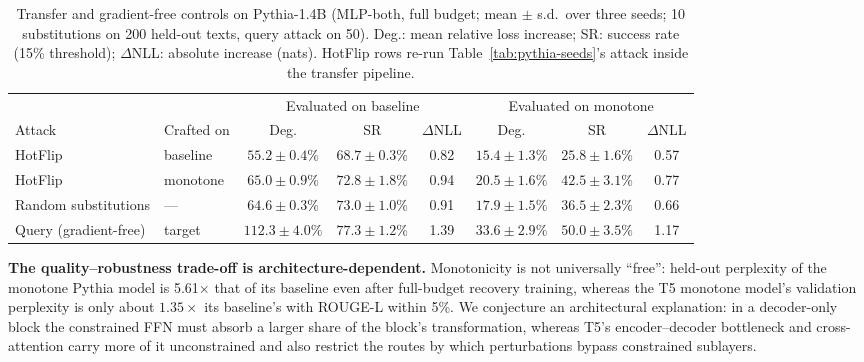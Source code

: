 \documentclass{article}
\theoremstyle{plain}
\theoremstyle{definition}
\theoremstyle{remark}
\theoremstyle{plain}
\begin{document}
\begin{table}[t]
\caption{Transfer and gradient-free controls on Pythia-1.4B (MLP-both, full budget; mean $\pm$ s.d.\ over three seeds; 10 substitutions on 200 held-out texts, query attack on 50). Deg.: mean relative loss increase; SR: success rate (15\% threshold); $\Delta$NLL: absolute increase (nats). HotFlip rows re-run Table~\ref{tab:pythia-seeds}'s attack inside the transfer pipeline.}
\label{tab:pythia-controls}
\centering
\footnotesize
\setlength{\tabcolsep}{2pt}
\begin{tabular}{llcccccc}
\toprule
 & & \multicolumn{3}{c}{Evaluated on baseline} & \multicolumn{3}{c}{Evaluated on monotone} \\
\cmidrule(lr){3-5}\cmidrule(lr){6-8}
Attack & Crafted on & Deg. & SR & $\Delta$NLL & Deg. & SR & $\Delta$NLL \\
\midrule
HotFlip & baseline & $55.2 \pm 0.4\%$ & $68.7 \pm 0.3\%$ & 0.82 & $15.4 \pm 1.3\%$ & $25.8 \pm 1.6\%$ & 0.57 \\
HotFlip & monotone & $65.0 \pm 0.9\%$ & $72.8 \pm 1.8\%$ & 0.94 & $20.5 \pm 1.6\%$ & $42.5 \pm 3.1\%$ & 0.77 \\
Random substitutions & --- & $64.6 \pm 0.3\%$ & $73.0 \pm 1.0\%$ & 0.91 & $17.9 \pm 1.5\%$ & $36.5 \pm 2.3\%$ & 0.66 \\
Query (gradient-free) & target & $112.3 \pm 4.0\%$ & $77.3 \pm 1.2\%$ & 1.39 & $33.6 \pm 2.9\%$ & $50.0 \pm 3.5\%$ & 1.17 \\
\bottomrule
\end{tabular}
\end{table}

\textbf{The quality--robustness trade-off is architecture-dependent.}
Monotonicity is not universally ``free'': held-out perplexity of the monotone Pythia model is 5.61$\times$ that of its baseline even after full-budget recovery training, whereas the T5 monotone model's validation perplexity is only about $1.35\times$ its baseline's with ROUGE-L within 5\%. We conjecture an architectural explanation: in a decoder-only block the constrained FFN must absorb a larger share of the block's transformation, whereas T5's encoder--decoder bottleneck and cross-attention carry more of it unconstrained and also restrict the routes by which perturbations bypass constrained sublayers.
\end{document}
